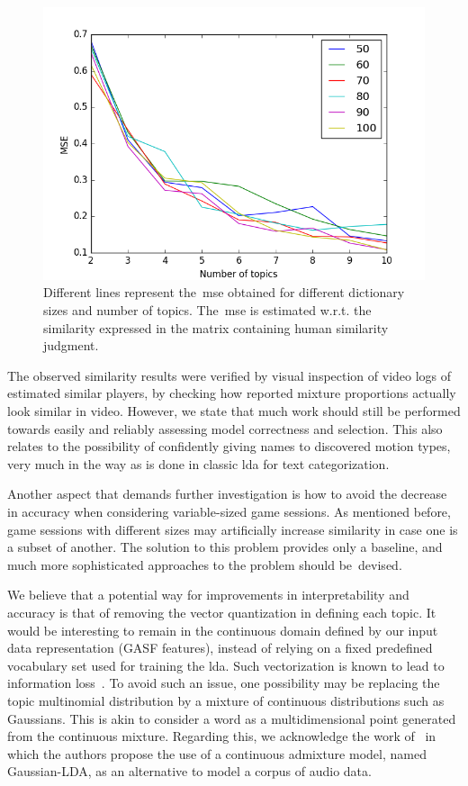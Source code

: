 \begin{figure}[h]
	\centering
	\includegraphics[scale=0.6]{images/05-modeling/mse_dictsize-50_100_10.png}
	\caption{Different lines represent the~\gls{mse} obtained for different dictionary sizes and number of topics. The~\gls{mse} is estimated w.r.t. the similarity expressed in the matrix containing human similarity judgment.}
  \label{hyperparameter_results}
\end{figure}

The observed similarity results were verified by visual inspection of video logs of estimated similar players, by checking how reported mixture proportions actually look similar in video. However, we state that much work should still be performed towards easily and reliably assessing model correctness and selection. This also relates to the possibility of confidently giving names to discovered motion types, very much in the way as is done in classic \gls{lda} for text categorization.

Another aspect that demands further investigation is how to avoid the decrease in accuracy when considering variable-sized game sessions. As mentioned before, game sessions with different sizes may artificially increase similarity in case one is a subset of another. The solution to this problem provides only a baseline, and much more sophisticated approaches to the problem should be~devised.

We believe that a potential way for improvements in interpretability and accuracy is that of removing the vector quantization in defining each topic. It would be interesting to remain in the continuous domain defined by our input data representation (GASF features), instead of relying on a fixed predefined vocabulary set used for training the \gls{lda}. Such vectorization is known to lead to information loss~\cite{hu_latent_2012}. To avoid such an issue, one possibility may be replacing the topic multinomial distribution by a mixture of continuous distributions such as Gaussians. This is akin to consider a word as a multidimensional point generated from the continuous mixture. Regarding this, we acknowledge the work of~\cite{hu_latent_2012} in which the authors propose the use of a continuous admixture model, named Gaussian-LDA, as an alternative to model a corpus of audio data. 

